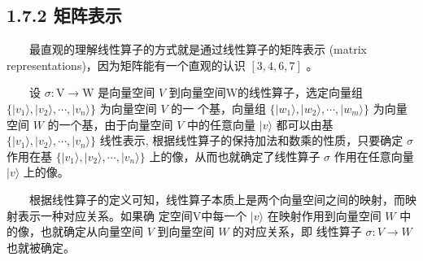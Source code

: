 \documentclass[a4paper,11pt,english]{sphinxmanual}
\begin{document}
\subsection{1.7.2 矩阵表示}
\label{\detokenize{rst/_u9644_u5f551_u91cf_u5b50_u8ba1_u7b97_u6570_u5b66_u57fa_u78405:id4}}
\sphinxAtStartPar
​  最直观的理解线性算子的方式就是通过线性算子的矩阵表示 (matrix representations)，因为矩阵能有一个直观的认识  \([3,4,6,7]\) 。

\sphinxAtStartPar
​  设  \(\sigma: \mathrm{V} \rightarrow \mathrm{W}\) 是向量空间  \(V\) 到向量空间W的线性算子，选定向量组  \(\{|v_{1}\rangle,|v_{2}\rangle, \cdots,|v_{n}\rangle\}\)  为向量空间  \(V\) 的一 个基，向量组  \(\{|w_{1}\rangle,|w_{2}\rangle, \cdots,|w_{m}\rangle\}\)  为向量空间  \(W\)  的一个基，由于向量空间 \(V\) 中的任意向量  \(|v\rangle\)  都可以由基  \(\{|v_{1}\rangle,|v_{2}\rangle, \cdots,|v_{n}\rangle\}\) 线性表示, 根据线性算子的保持加法和数乘的性质，只要确定 \(\sigma\) 作用在基 \(\{|v_{1}\rangle,|v_{2}\rangle, \cdots,|v_{n}\rangle\}\) 上的像，从而也就确定了线性算子 \(\sigma\) 作用在任意向量  \(| {v}\rangle\) 上的像。

\sphinxAtStartPar
​  根据线性算子的定义可知，线性算子本质上是两个向量空间之间的映射，而映射表示一种对应关系。如果确 定空间V中每一个  \(|v\rangle\) 在映射作用到向量空间 \(W\) 中的像，也就确定从向量空间 \(V\) 到向量空间 \(W\) 的对应关系，即 线性算子  \(\sigma: V \rightarrow W\) 也就被确定。
\end{document}
